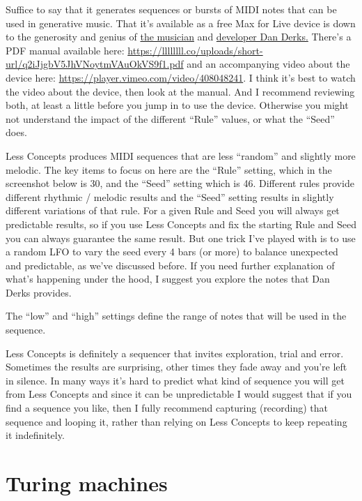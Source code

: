 \documentclass[
  12pt,
  letterpaper,
  oneside,
  open=any]{scrbook}
\makeatletter
\newcommand*\pandocbounded[1]{%
  \sbox\pandoc@box{#1}%
  \Gscale@div\@tempa{\textheight}{\dimexpr\ht\pandoc@box+\dp\pandoc@box\relax}%
  \Gscale@div\@tempb{\linewidth}{\wd\pandoc@box}%
  \ifdim\@tempb\p@<\@tempa\p@\let\@tempa\@tempb\fi%
  \ifdim\@tempa\p@<\p@\scalebox{\@tempa}{\usebox\pandoc@box}%
  \else\usebox{\pandoc@box}%
  \fi%
}
\makeatother
\begin{document}
Suffice to say that it generates sequences or bursts of MIDI notes that
can be used in generative music. That it's available as a free Max for
Live device is down to the generosity and genius of
\href{https://dndrks.bandcamp.com}{the musician} and
\href{https://github.com/dndrks}{developer Dan Derks.} There's a PDF
manual available here:
\url{https://llllllll.co/uploads/short-url/q2iJjgbV5JhVNoytmVAuOkVS9f1.pdf}
and an accompanying video about the device here:
\url{https://player.vimeo.com/video/408048241}. I think it's best to
watch the video about the device, then look at the manual. And I
recommend reviewing both, at least a little before you jump in to use
the device. Otherwise you might not understand the impact of the
different ``Rule'' values, or what the ``Seed'' does.

Less Concepts produces MIDI sequences that are less ``random'' and
slightly more melodic. The key items to focus on here are the ``Rule''
setting, which in the screenshot below is 30, and the ``Seed'' setting
which is 46. Different rules provide different rhythmic / melodic
results and the ``Seed'' setting results in slightly different
variations of that rule. For a given Rule and Seed you will always get
predictable results, so if you use Less Concepts and fix the starting
Rule and Seed you can always guarantee the same result. But one trick
I've played with is to use a random LFO to vary the seed every 4 bars
(or more) to balance unexpected and predictable, as we've discussed
before. If you need further explanation of what's happening under the
hood, I suggest you explore the notes that Dan Derks provides.

The ``low'' and ``high'' settings define the range of notes that will be
used in the sequence.

Less Concepts is definitely a sequencer that invites exploration, trial
and error. Sometimes the results are surprising, other times they fade
away and you're left in silence. In many ways it's hard to predict what
kind of sequence you will get from Less Concepts and since it can be
unpredictable I would suggest that if you find a sequence you like, then
I fully recommend capturing (recording) that sequence and looping it,
rather than relying on Less Concepts to keep repeating it indefinitely.

\pandocbounded{\texttt{[image: images/Less\_concepts.png]}}

\section{Turing machines}\label{turing-machines}
\end{document}
